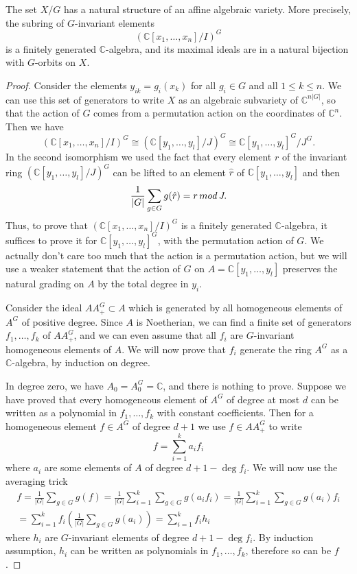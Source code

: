 \documentclass[10pt,a4paper]{amsart}
\newcommand{\C}{{\mathbb C}}
\begin{document}
\begin{thm}\label{XG}
The set $X/G$ has a natural structure of an affine algebraic variety. More precisely, the subring of $G$-invariant elements
$$
(\C[x_1,\ldots,x_n]/I)^G
$$
is a finitely generated $\C$-algebra, and its maximal ideals are in a natural bijection with $G$-orbits on $X$.
\end{thm}

\begin{proof}
Consider the elements $y_{ik} = g_i(x_k)$ for all $g_i\in G$ and all $1\leq k\leq n$. We can use this set of generators to write $X$ as an algebraic subvariety of $\C^{n|G|}$, so that the action of $G$ comes from a permutation action on the coordinates of $\C^n$.
Then we have 
$$
(\C[x_1,\ldots,x_n]/I)^G \cong (\C[y_1,\ldots,y_l]/J)^G\cong \C[y_1,\ldots,y_l]^G/J^G.
$$
In the second isomorphism we used the fact that every element $r$ of the invariant ring  $(\C[y_1,\ldots,y_l]/J)^G$
can be lifted to an element $\hat r$ of  $\C[y_1,\ldots,y_l]$ and then 
$$\frac 1{|G|}\sum_{g\in G} g(\hat r)=r\,{\rm mod}\,J.$$
Thus, to prove that $(\C[x_1,\ldots,x_n]/I)^G$ is a finitely generated $\C$-algebra, it suffices to prove it for
$ \C[y_1,\ldots,y_l]^G$, with the permutation action of $G$.
We actually don't care too much that the action is a permutation action, but we will use a weaker statement that the action of 
$G$ on $A= \C[y_1,\ldots,y_l]$ preserves the natural grading on $A$ by the total degree in $y_i$.  

\smallskip
Consider the ideal $A A_+^G\subset A$ which is generated by all homogeneous elements of $A^G$ of positive degree. Since $A$ is Noetherian, we can find a finite set of generators $f_1,\ldots, f_k$ of $A A_+^G$, and we can even assume that all $f_i$ are $G$-invariant homogeneous elements of $A$. We will now prove that
$f_i$ generate the ring $A^G$ as a $\C$-algebra, by induction on degree.

\smallskip
In degree zero, we have $A_0 = A^G_{0}=\C$, and there is nothing to prove. Suppose we have proved that every homogeneous element of $A^G$ of degree at most $d$ can be written as a polynomial in $f_1,\ldots, f_k$ with constant coefficients. Then for a homogeneous element $f\in A^G$ of degree $d+1$ we use $f\in AA_+^G$ to write 
$$
f = \sum_{i=1}^k a_i f_i
$$
where $a_i$ are some elements of $A$ of degree $d+1-\deg f_i$. We will now use the averaging trick
\begin{align*}
f = \frac 1{|G|} \sum_{g\in G}g(f) =\frac 1{|G|} \sum_{i=1}^k  \sum_{g\in G}g(a_i f_i) 
=\frac 1{|G|} \sum_{i=1}^k  \sum_{g\in G}g(a_i) f_i
\\
=\sum_{i=1}^k  f_i \left(\frac 1{|G|} \sum_{g\in G}g(a_i) \right) = \sum_{i=1}^k f_i h_i
\end{align*}
where $h_i$ are $G$-invariant elements of degree $d+1-\deg f_i$. By induction assumption, $h_i$ can be written as polynomials in $f_1,\ldots,f_k$, therefore so can be $f$.


\end{proof}
\end{document}
